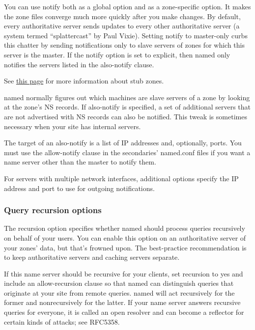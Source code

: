 You can use {notify} both as a global option and as a zone-specific
option. It makes the zone files converge much more quickly after you
make changes. By default, every authoritative server sends updates to
every other authoritative server (a system termed
``\protect\hypertarget{part0024_split_037.htmlux5cux23_idIndexMarker2129}{}{}\protect\hypertarget{part0024_split_037.htmlux5cux23_idIndexMarker2130}{}{}splattercast''
by
\protect\hypertarget{part0024_split_037.htmlux5cux23_idIndexMarker2131}{}{}Paul
Vixie). Setting {notify} to {master-only} curbs this chatter by sending
notifications only to slave servers of zones for which this server is
the master. If the {notify} option is set to {explicit,} then {named}
only notifies the servers listed in the {also-notify} clause.

\leavevmode\hypertarget{part0024_split_037.htmlux5cux23_idContainer976}{}%
See
\protect\hyperlink{part0024_split_044.htmlux5cux23_idTextAnchor914}{this
page} for more information about stub zones.

{named} normally figures out which machines are slave servers of a zone
by looking at the zone's NS records. If {also-notify} is specified, a
set of additional servers that are not advertised with NS records can
also be notified. This tweak is sometimes necessary when your site has
internal servers.

The target of an {also-notify} is a list of IP addresses and,
optionally, ports. You must use the {allow-notify} clause in the
secondaries' {named.conf} files if you want a name server other than the
master to notify them.

For servers with multiple network interfaces, additional options specify
the IP address and port to use for outgoing notifications.

\subsubsection{Query recursion options}


The
\protect\hypertarget{part0024_split_037.htmlux5cux23_idIndexMarker2132}{}{}{recursion}
option specifies whether {named} should process queries recursively on
behalf of your users. You can enable this option on an authoritative
server of your zones' data, but that's frowned upon. The best-practice
recommendation is to keep authoritative servers and caching servers
separate.

\protect\hypertarget{part0024_split_037.htmlux5cux23_idIndexMarker2133}{}{}If
this name server should be recursive for your clients, set {recursion}
to {yes} and include an {allow-recursion} clause so that {named} can
distinguish queries that originate at your site from remote queries.
{named} will act recursively for the former and nonrecursively for the
latter. If your name server answers recursive queries for everyone, it
is called an open resolver and can become a reflector for certain kinds
of attacks; see RFC5358.

